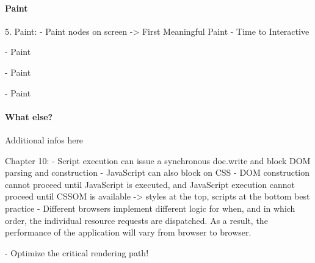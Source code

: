 
\paragraph{Paint}




5. Paint:
- Paint nodes on screen
-> First Meaningful Paint
- Time to Interactive


- Paint



- Paint


- Paint








\paragraph{What else?}

Additional infos here








Chapter 10:
- Script execution can issue a synchronous doc.write and block DOM parsing and construction
- JavaScript can also block on CSS
- DOM construction cannot proceed until JavaScript is executed, and JavaScript execution cannot proceed until CSSOM is available
-> styles at the top, scripts at the bottom best practice
- Different browsers implement different logic for when, and in which order, the individual resource requests are dispatched. As a result, the performance of the application will vary from browser to browser.


- Optimize the critical rendering path!


